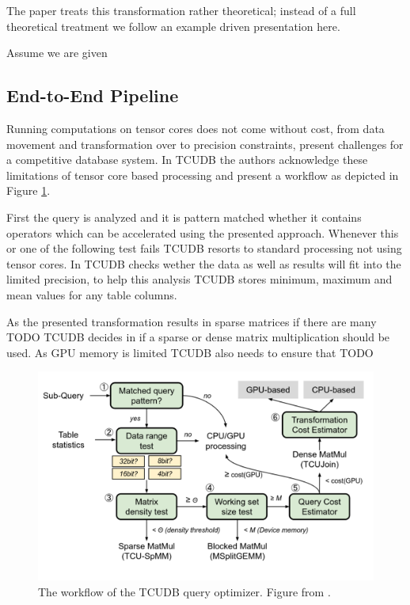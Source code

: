 \documentclass{paper}
\begin{document}
	The paper \cite{hu2021tcudb} treats this transformation rather theoretical; instead of a full theoretical treatment we follow an example driven presentation here.
	
	Assume we are given 
	
	\subsection{End-to-End Pipeline}
	
	Running computations on tensor cores does not come without cost, from data movement and transformation over to precision constraints, present challenges for a competitive database system. In TCUDB the authors acknowledge these limitations of tensor core based processing and present a workflow as depicted in Figure \ref{fig:pipeline}.

	First the query is analyzed  and it is pattern matched whether it contains operators which can be accelerated using the presented approach. Whenever this or one of the following test fails TCUDB resorts to standard processing not using tensor cores. In  TCUDB checks wether the data as well as results will fit into the limited precision, to help this analysis TCUDB stores minimum, maximum and mean values for any table columns.
	
	As the presented transformation results in sparse matrices if there are many TODO TCUDB decides in  if a sparse or dense matrix multiplication should be used. As GPU memory is limited TCUDB also needs to ensure that  TODO
	
	\begin{figure}[h]
		\centering
		\includegraphics[width=0.9\linewidth]{pipeline}
		\caption{The workflow of the TCUDB query optimizer. Figure from \cite{hu2021tcudb}.} 
		\label{fig:pipeline}
	\end{figure}
	
\end{document}
